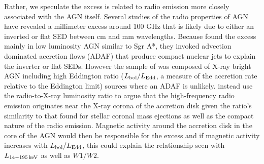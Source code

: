 Rather, we speculate the excess is related to radio emission more closely associated with the AGN itself. Several studies of the radio properties of AGN have revealed a millimeter excess around 100 GHz \citep{Doi:2005wj,Doi:2011si,Behar:2015le,Scharwachter:2015ez} that is likely due to either an inverted or flat SED between cm and mm wavelengths. Because \citet{Doi:2011si} found the excess mainly in low luminosity AGN similar to Sgr A*, they invoked advection dominated accretion flows (ADAF) that produce compact nuclear jets to explain the inverter or flat SEDs. However the sample of \citet{Behar:2015le} was composed of X-ray bright AGN including high Eddington ratio ($L_{\rm bol}/L_{\rm Edd}$, a measure of the accretion rate relative to the Eddington limit) sources where an ADAF is unlikely. \citet{Behar:2015le} instead use the radio-to-X-ray luminosity ratio to argue that the high-frequency radio emission originates near the X-ray corona of the accretion disk given the ratio's similarity to that found for stellar coronal mass ejections \citep[e.g][]{Bastian:1998tx} as well as the compact nature of the radio emission. Magnetic activity around the accretion disk in the core of the AGN would then be responsible for the excess and if magnetic activity increases with $L_{\rm bol}/L_{\rm Edd}$, this could explain the relationship seen with $L_{\rm 14-195\,keV}$ as well as $W1/W2$. 
  
  
  